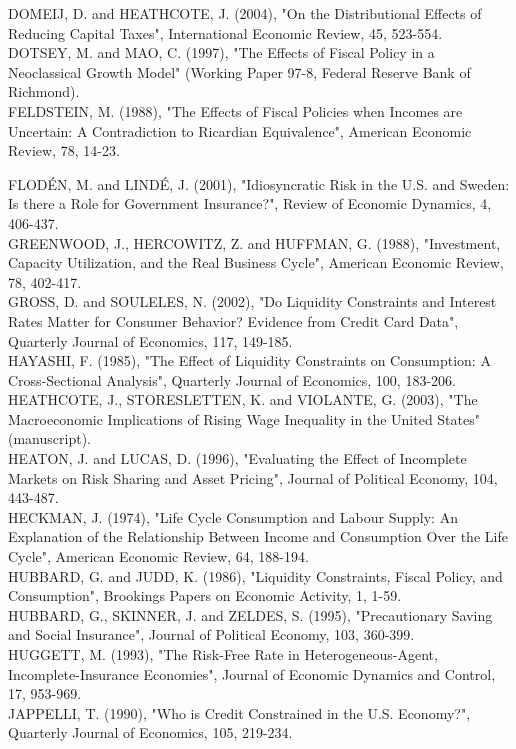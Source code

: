 \documentclass[11pt]{article}
\begin{document}
DOMEIJ, D. and HEATHCOTE, J. (2004), "On the Distributional Effects of Reducing Capital Taxes", International Economic Review, 45, 523-554.\\
DOTSEY, M. and MAO, C. (1997), "The Effects of Fiscal Policy in a Neoclassical Growth Model" (Working Paper 97-8, Federal Reserve Bank of Richmond).\\
FELDSTEIN, M. (1988), "The Effects of Fiscal Policies when Incomes are Uncertain: A Contradiction to Ricardian Equivalence", American Economic Review, 78, 14-23.

FLODÉN, M. and LINDÉ, J. (2001), "Idiosyncratic Risk in the U.S. and Sweden: Is there a Role for Government Insurance?", Review of Economic Dynamics, 4, 406-437.\\
GREENWOOD, J., HERCOWITZ, Z. and HUFFMAN, G. (1988), "Investment, Capacity Utilization, and the Real Business Cycle", American Economic Review, 78, 402-417.\\
GROSS, D. and SOULELES, N. (2002), "Do Liquidity Constraints and Interest Rates Matter for Consumer Behavior? Evidence from Credit Card Data", Quarterly Journal of Economics, 117, 149-185.\\
HAYASHI, F. (1985), "The Effect of Liquidity Constraints on Consumption: A Cross-Sectional Analysis", Quarterly Journal of Economics, 100, 183-206.\\
HEATHCOTE, J., STORESLETTEN, K. and VIOLANTE, G. (2003), "The Macroeconomic Implications of Rising Wage Inequality in the United States" (manuscript).\\
HEATON, J. and LUCAS, D. (1996), "Evaluating the Effect of Incomplete Markets on Risk Sharing and Asset Pricing", Journal of Political Economy, 104, 443-487.\\
HECKMAN, J. (1974), "Life Cycle Consumption and Labour Supply: An Explanation of the Relationship Between Income and Consumption Over the Life Cycle", American Economic Review, 64, 188-194.\\
HUBBARD, G. and JUDD, K. (1986), "Liquidity Constraints, Fiscal Policy, and Consumption", Brookings Papers on Economic Activity, 1, 1-59.\\
HUBBARD, G., SKINNER, J. and ZELDES, S. (1995), "Precautionary Saving and Social Insurance", Journal of Political Economy, 103, 360-399.\\
HUGGETT, M. (1993), "The Risk-Free Rate in Heterogeneous-Agent, Incomplete-Insurance Economies", Journal of Economic Dynamics and Control, 17, 953-969.\\
JAPPELLI, T. (1990), "Who is Credit Constrained in the U.S. Economy?", Quarterly Journal of Economics, 105, 219-234.\\
\end{document}
